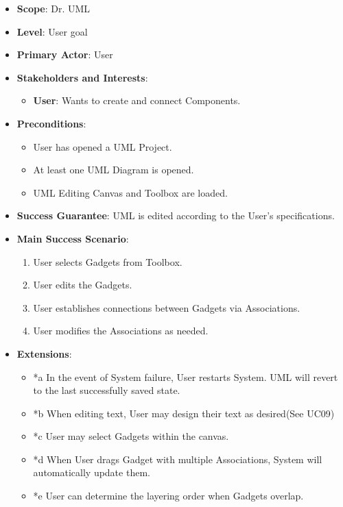 \documentclass[12pt]{article}
\begin{document}
    \begin{itemize}
        \item \textbf{Scope}: Dr. UML
        \item \textbf{Level}: User goal
        \item \textbf{Primary Actor}: User
        \item \textbf{Stakeholders and Interests}:
        \begin{itemize}
            \item \textbf{User}: Wants to create and connect Components.
        \end{itemize}
        \item \textbf{Preconditions}:
        \begin{itemize}
            \item User has opened a UML Project.
            \item At least one UML Diagram is opened.
            \item UML Editing Canvas and Toolbox are loaded.
        \end{itemize}
        \item \textbf{Success Guarantee}: UML is edited according to the User’s specifications.
        \item \textbf{Main Success Scenario}:
        \begin{enumerate}
            \item User selects Gadgets from Toolbox.
            \item User edits the Gadgets.
            \item User establishes connections between Gadgets via Associations.
            \item User modifies the Associations as needed.
        \end{enumerate}
        \item \textbf{Extensions}:
        \begin{itemize}
            \item *a In the event of System failure, User restarts System.
            UML will revert to the last successfully saved state.
            \item *b When editing text, User may design their text as desired(See UC09)
            \item *c User may select Gadgets within the canvas.
            \item *d When User drags Gadget with multiple Associations, System will automatically update them.
            \item *e User can determine the layering order when Gadgets overlap.

\end{itemize}
\end{itemize}
\end{document}
